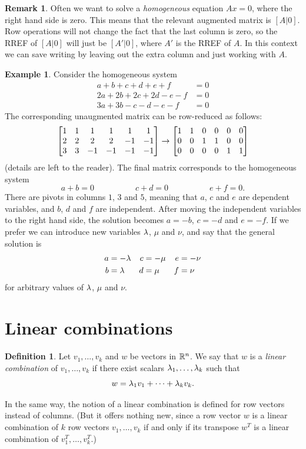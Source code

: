 \documentclass[reqno]{amsart}
\theoremstyle{definition}
\newtheorem{remark}[theorem]{Remark}
\newtheorem{definition}[theorem]{Definition}
\newtheorem{example}[theorem]{Example}
\newcommand{\dfn}[1]{\emph{{#1}}\index{#1}}
\begin{document}
\begin{remark}
 Often we want to solve a \dfn{homogeneous} equation $Ax=0$, where
 the right hand side is zero.  This means that the relevant augmented
 matrix is $[A|0]$.  Row operations will not change the fact that the last
 column is zero, so the RREF of $[A|0]$ will just be $[A'|0]$, where
 $A'$ is the RREF of $A$.  In this context we can save writing by
 leaving out the extra column and just working with $A$.
\end{remark}
\begin{example}\label{eg-homogeneous}
 Consider the homogeneous system
 \begin{align*}
  a+b+c+d+e+f &= 0 \\
  2a+2b+2c+2d-e-f &= 0 \\
  3a+3b-c-d-e-f &= 0
 \end{align*}
 The corresponding unaugmented matrix can be row-reduced as follows:
 \[
  \left[\begin{matrix}
    1 &  1 &  1 &  1 &  1 &  1 \\
    2 &  2 &  2 &  2 & -1 & -1 \\
    3 &  3 & -1 & -1 & -1 & -1
  \end{matrix}\right] \to \left[\begin{matrix}
    1 &  1 &  0 &  0 &  0 &  0 \\
    0 &  0 &  1 &  1 &  0 &  0 \\
    0 &  0 &  0 &  0 &  1 &  1 
  \end{matrix}\right]
 \]
 (details are left to the reader).  The final matrix corresponds to
 the homogeneous system
 \[ a+b = 0 \hspace{5em} c+d=0 \hspace{5em} e+f=0. \]
 There are pivots in columns $1$, $3$ and $5$, meaning that $a$, $c$
 and $e$ are dependent variables, and $b$, $d$ and $f$ are
 independent.  After moving the independent variables to the right
 hand side, the solution becomes $a=-b$, $c=-d$ and $e=-f$.  If we
 prefer we can introduce new variables $\lambda$, $\mu$ and $\nu$, and say
 that the general solution is
 \begin{align*}
  a &= -\lambda & c &= -\mu & e &= -\nu \\
  b &=  \lambda & d &=  \mu & f &=  \nu
 \end{align*}
 for arbitrary values of $\lambda$, $\mu$ and $\nu$.
\end{example}

\section{Linear combinations}
\label{sec-lin-comb}

\begin{definition}\label{defn-lincomb}
 Let $v_1,\dotsc,v_k$ and $w$ be vectors in ${\mathbb{R}}^n$.  We say that $w$
 is a \dfn{linear combination} of $v_1,\dotsc,v_k$ if there exist
 scalars $\lambda_1,\dots,\lambda_k$ such that
 \[ w = \lambda_1v_1 + \dotsb + \lambda_kv_k. \]
 
 In the same way, the notion of a linear combination is defined
 for row vectors instead of columns.
 (But it offers nothing new, since a row vector $w$ is a
 linear combination of $k$ row vectors $v_1,\dotsc,v_k$
 if and only if its transpose $w^T$ is a linear combination
 of $v_1^T,\dotsc,v_k^T$.)
\end{definition}
\end{document}
